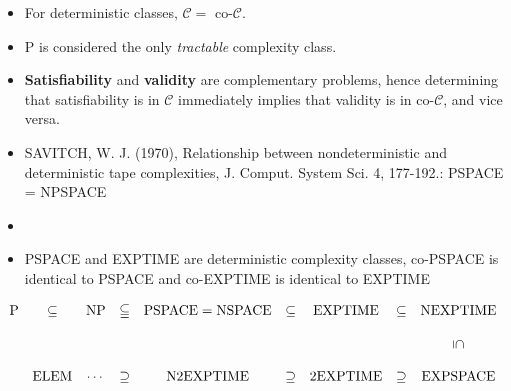 \documentclass[a4paper,12pt,landscape]{article}
\begin{document}
\begin{itemize}
    \item 
    For deterministic classes, $\mathcal{C} = $ co-$\mathcal{C}$.

    \item $\mathrm{P}$ is considered the only \textit{tractable} complexity class.

    \item \textbf{Satisfiability} and \textbf{validity} are complementary problems, 
    hence determining that satisfiability is in $\mathcal{C}$ immediately implies that validity is in co-$\mathcal{C}$,  
    and vice versa.

    \item 
    SAVITCH, W. J. (1970), Relationship between nondeterministic and deterministic tape
complexities, J. Comput. System Sci. 4, 177-192.: PSPACE = NPSPACE

\item 
    \item 
    PSPACE and EXPTIME are deterministic complexity classes, co-PSPACE is identical to PSPACE and co-EXPTIME is identical to EXPTIME
\end{itemize}


\vspace{1.5em}


\[\begin{array}{ccccccccccccc}
    \mathrm{P} & \subseteq & \mathrm{NP} & \subseteqq & \mathrm{PSPACE}=\mathrm{NSPACE} & \subseteq & \mathrm{EXPTIME} & \subseteq & \mathrm{NEXPTIME}  \\
    
    \\ 

    &&&&&&&& \rotatebox[origin=c]{270}{$\subseteq$} \\   

    \\

    &
    \mathrm{ELEM} & \cdots &
    \supseteq & 
    \mathrm{N2EXPTIME} & 
    \supseteq & 
    \mathrm{2EXPTIME} & 
    \supseteq & 
    \mathrm{EXPSPACE}   \\




\end{array}\]



\begin{figure}[ht!]
    \centering
\end{figure}
\end{document}
